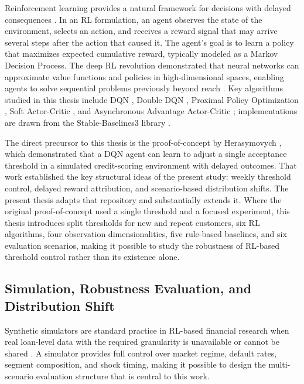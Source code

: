 \documentclass[12pt,a4paper]{article}
\begin{document}
Reinforcement learning provides a natural framework for decisions with delayed consequences \cite{sutton2018, dayan2008}. In an RL formulation, an agent observes the state of the environment, selects an action, and receives a reward signal that may arrive several steps after the action that caused it. The agent's goal is to learn a policy that maximizes expected cumulative reward, typically modeled as a Markov Decision Process. The deep RL revolution demonstrated that neural networks can approximate value functions and policies in high-dimensional spaces, enabling agents to solve sequential problems previously beyond reach \cite{arulkumaran2017}. Key algorithms studied in this thesis include DQN \cite{mnih2015dqn}, Double DQN \cite{van2016ddqn}, Proximal Policy Optimization \cite{schulman2017ppo}, Soft Actor-Critic \cite{haarnoja2018sac}, and Asynchronous Advantage Actor-Critic \cite{mnih2016a3c}; implementations are drawn from the Stable-Baselines3 library \cite{stable_baselines3}.

The direct precursor to this thesis is the proof-of-concept by Herasymovych \cite{herasymovych2019}, which demonstrated that a DQN agent can learn to adjust a single acceptance threshold in a simulated credit-scoring environment with delayed outcomes. That work established the key structural ideas of the present study: weekly threshold control, delayed reward attribution, and scenario-based distribution shifts. The present thesis adapts that repository and substantially extends it. Where the original proof-of-concept used a single threshold and a focused experiment, this thesis introduces split thresholds for new and repeat customers, six RL algorithms, four observation dimensionalities, five rule-based baselines, and six evaluation scenarios, making it possible to study the robustness of RL-based threshold control rather than its existence alone.

\subsection{Simulation, Robustness Evaluation, and Distribution Shift}

Synthetic simulators are standard practice in RL-based financial research when real loan-level data with the required granularity is unavailable or cannot be shared \cite{herasymovych2019}. A simulator provides full control over market regime, default rates, segment composition, and shock timing, making it possible to design the multi-scenario evaluation structure that is central to this work.
\end{document}
